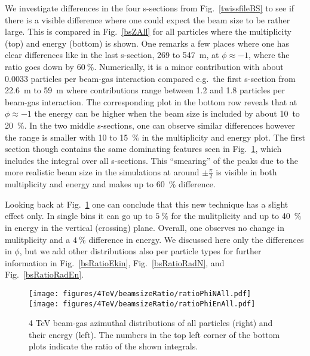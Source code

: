 
We investigate differences in the four s-sections from Fig.~\ref{twissfileBS} to see if there is a visible difference where one could expect the beam size to be rather large. This is compared in Fig.~\ref{bsZAll} for all particles where the multiplicity (top) and energy (bottom) is shown. One remarks a few places where one has clear differences like in the last s-section, 269 to 547~m, at $\phi \approx -1$, where the ratio goes down by $60~\%$. Numerically, it is a minor contribution with about 0.0033 particles per beam-gas interaction compared e.g.~the first s-section from 22.6~m to 59~m where contributions range between 1.2 and 1.8 particles per beam-gas interaction. The corresponding plot in the bottom row reveals that at $\phi \approx -1$ the energy can be higher when the beam size is included by about 10~to 20~$\%$.
In the two middle s-sections, one can observe similar differences however the range is smaller with 10 to 15~$\%$ in the multiplicity and energy plot. The first section though contains the same dominating features seen in Fig.~\ref{bsRatioPhiAll}, which includes the integral over all s-sections. This ``smearing'' of the peaks due to the more realistic beam size in the simulations at around $\pm \frac{\pi}{2}$ is visible in both multiplicity and energy and makes up to 60~$\%$ difference.

Looking back at Fig.~\ref{bsRatioPhiAll} one can conclude that this new technique has a slight effect only. In single bins it can go up to $5~\%$ for the mulitplicity and up to 40~$\%$ in energy in the vertical (crossing) plane. Overall, one observes no change in mulitplicity and a $4~\%$ difference in energy. We discussed here only the differences in $\phi$, but we add other distributions also per particle types for further information in Fig.~\ref{bsRatioEkin}, Fig.~\ref{bsRatioRadN}, and Fig.~\ref{bsRatioRadEn}.

\begin{figure}%
\begin{center}
  \texttt{[image: figures/4TeV/beamsizeRatio/ratioPhiNAll.pdf]}
  \texttt{[image: figures/4TeV/beamsizeRatio/ratioPhiEnAll.pdf]}
\end{center}
\vspace{-0.6cm}
 \caption{4 TeV beam-gas azimuthal distributions of all particles (right) and their energy (left). The numbers in the top left corner of the bottom plots indicate the ratio of the shown integrals.
  \label{bsRatioPhiAll}} 
\end{figure}


